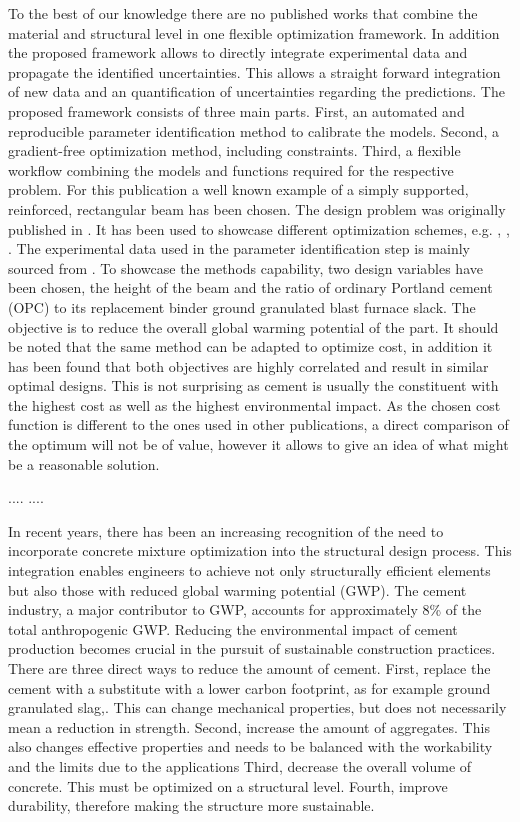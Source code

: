To the best of our knowledge there are no published works that combine the material and structural level in one flexible optimization framework.
In addition the proposed framework allows to directly integrate experimental data and propagate the identified uncertainties.
This allows a straight forward integration of new data and an quantification of uncertainties regarding the predictions.
The proposed framework consists of three main parts.
First, an automated and reproducible parameter identification method to calibrate the models.
Second, a gradient-free optimization method, including constraints.
Third, a flexible workflow combining the models and functions required for the respective problem. 
For this publication a well known example of a simply supported, reinforced, rectangular beam  has been chosen.
The design problem was originally published in \cite{everard1966reinforced}.
It has been used to showcase different optimization schemes, e.g. \cite{Chakrabarty_1992}, \cite{Coello_1997}, \cite{Pierott_2021}.
The experimental data used in the parameter identification step is mainly sourced from \cite{gruyaert2011}.
To showcase the methods capability, two design variables have been chosen, the height of the beam and the ratio of ordinary Portland cement (OPC) to its replacement binder ground granulated blast furnace slack.
The objective is to reduce the overall global warming potential of the part.
It should be noted that the same method can be adapted to optimize cost, in addition it has been found that both objectives are highly correlated and result in similar optimal designs.
This is not surprising as cement is usually the constituent with the highest cost as well as the highest environmental impact.
As the chosen cost function is different to the ones used in other publications, a direct comparison of the optimum will not be of value, however it allows to give an idea of what might be a reasonable solution.



....
....

In recent years, there has been an increasing recognition of the need to incorporate concrete mixture optimization into the structural design process. 
This integration enables engineers to achieve not only structurally efficient elements but also those with reduced global warming potential (GWP). 
The cement industry, a major contributor to GWP, accounts for approximately 8\% of the total anthropogenic GWP. 
Reducing the environmental impact of cement production becomes crucial in the pursuit of sustainable construction practices.
There are three direct ways to reduce the amount of cement.
First, replace the cement with a substitute with a lower carbon footprint, as for example ground granulated slag,.
This can change mechanical properties, but does not necessarily mean a reduction in strength.
Second, increase the amount of aggregates.
This also changes effective properties and needs to be balanced with the workability and the limits due to the applications
Third, decrease the overall volume of concrete.
This must be optimized on a structural level.
Fourth, improve durability, therefore making the structure more sustainable.

